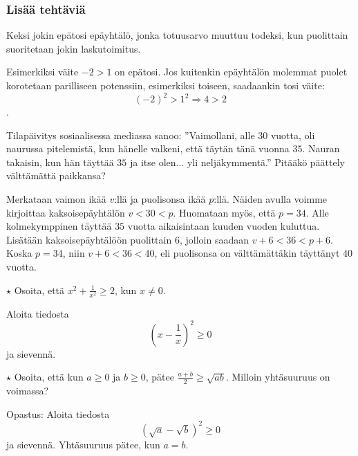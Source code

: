 \begin{tehtavasivu}
\subsubsection*{Lisää tehtäviä}

\begin{tehtava}
Keksi jokin epätosi epäyhtälö, jonka totuusarvo muuttuu todeksi, kun puolittain suoritetaan jokin laskutoimitus.
	\begin{vastaus}
	Esimerkiksi väite $-2>1$ on epätosi. Jos kuitenkin epäyhtälön molemmat puolet korotetaan parilliseen potenssiin, esimerkiksi toiseen, saadaankin tosi väite: \[(-2)^2>1^2 \Rightarrow 4>2\].
	\end{vastaus}
\end{tehtava}

\begin{tehtava}
Tilapäivitys sosiaalisessa mediassa sanoo: ''Vaimollani, alle $30$ vuotta, oli naurussa pitelemistä, kun hänelle valkeni, että täytän tänä vuonna $35$. Nauran takaisin, kun hän täyttää $35$ ja itse olen... yli neljäkymmentä.'' Pitääkö päättely välttämättä paikkansa?
		\begin{vastaus}
		Merkataan vaimon ikää $v$:llä ja puolisonsa ikää $p$:llä. Näiden avulla voimme kirjoittaa kaksoisepäyhtälön $v<30<p$. Huomataan myös, että $p=34$. Alle kolmekymppinen täyttää $35$ vuotta aikaisintaan kuuden vuoden kuluttua. Lisätään kaksoisepäyhtälöön puolittain $6$, jolloin saadaan $v+6<36<p+6$. Koska $p=34$, niin $v+6<36<40$, eli puolisonsa on välttämättäkin täyttänyt $40$ vuotta.
		\end{vastaus}
\end{tehtava}

\begin{tehtava}
$\star$ Osoita, että $x^2+\frac{1}{x^2}\geq 2$, kun $x \neq 0$.
    \begin{vastaus}
     Aloita tiedosta \[\left(x-\frac{1}{x}\right)^2 \geq 0\] ja sievennä.
    \end{vastaus}
\end{tehtava}

\begin{tehtava} 
$\star$ Osoita, että kun $a \geq 0$ ja $b \geq 0$, pätee $\frac{a+b}{2} \geq \sqrt{ab}$. Milloin yhtäsuuruus on voimassa?
    \begin{vastaus}
     Opastus: Aloita tiedosta \[\left(\sqrt{a}-\sqrt{b}\right)^2 \geq 0\] ja sievennä. Yhtäsuuruus pätee, kun $a = b$.
    \end{vastaus}
\end{tehtava}


\end{tehtavasivu}
